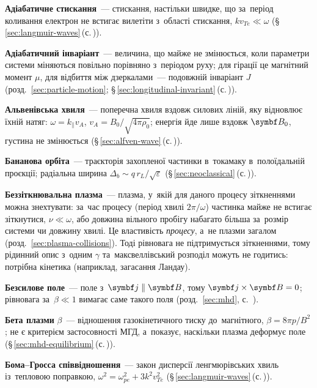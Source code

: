 	\item \textbf{Адіабатичне стискання}~--- стискання, настільки швидке, що за~період коливання електрон не встигає
	  вилетіти з~області стискання, $kv_{Te}\ll\omega$ (§\,\ref{sec:langmuir-waves}\,(с.\,\pageref{sec:langmuir-waves})).
	\item \textbf{Адіабатичний інваріант}~--- величина, що майже не змінюється, коли параметри системи міняються повільно порівняно з~періодом руху; для гірації це магнітний момент $\mu$, для відбиття між дзеркалами~--- подовжній інваріант $J$ (розд.~\ref{sec:particle-motion}; §\,\ref{sec:longitudinal-invariant}\,(с.\,\pageref{sec:longitudinal-invariant})).
	\item \textbf{Альвенівська хвиля}~--- поперечна хвиля вздовж силових ліній, яку відновлює їхній натяг:
	  $\omega=k_\parallel v_A$, $v_A=B_0/\sqrt{4\pi\rho_0}$; енергія йде лише вздовж $\vect B_0$, густина не змінюється (§\,\ref{sec:alfven-wave}\,(с.\,\pageref{sec:alfven-wave})).
	\item \textbf{Бананова орбіта}~--- траєкторія захопленої частинки в~токамаку в~полоїдальній проєкції; радіальна ширина $\Delta_b\sim q\,r_L/\sqrt\varepsilon$ (§\,\ref{sec:neoclassical}\,(с.\,\pageref{sec:neoclassical})).
	\item \textbf{Беззіткнювальна плазма}~--- плазма, у~якій для даного процесу зіткненнями можна знехтувати: за~час процесу
	  (період хвилі $2\pi/\omega$) частинка майже не встигає зіткнутися, $\nu\ll\omega$, або довжина вільного пробігу набагато більша за~розмір системи
	  чи довжину хвилі. Це властивість \emph{процесу}, а~не плазми загалом (розд.~\ref{sec:plasma-collisions}). Тоді рівновага не підтримується зіткненнями,
	  тому рідинний опис з~одним $\gamma$ та~максвеллівський розподіл можуть не годитись: потрібна кінетика (наприклад, загасання Ландау).
	\item \textbf{Безсилове поле}~--- поле з~$\vect j\parallel\vect B$, тому $\vect j\times\vect B=0$; рівновага за~$\beta\ll1$ вимагає саме такого поля (розд.~\ref{sec:mhd}, с.~\pageref{sec:mhd}).
	\item \textbf{Бета плазми} $\beta$~--- відношення газокінетичного тиску до~магнітного, $\beta=8\pi p/B^2$; не є критерієм застосовності МГД, а~показує, наскільки плазма деформує поле (§\,\ref{sec:mhd-equilibrium}\,(с.\,\pageref{sec:mhd-equilibrium})).
	\item \textbf{Бома--Гросса співвідношення}~--- закон дисперсії ленгмюрівських хвиль із~тепловою поправкою,
	  $\omega^2=\omega_{pe}^2+3k^2v_{Te}^2$ (§\,\ref{sec:langmuir-waves}\,(с.\,\pageref{sec:langmuir-waves})).
